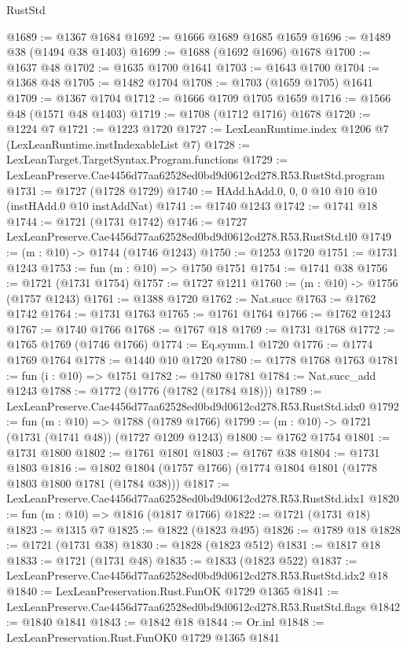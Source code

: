 \begin{lexlean}{RustStd}
\begin{coremodule}
@1689 := @1367 @1684
@1692 := @1666 @1689 @1685 @1659
@1696 := @1489 @38 (@1494 @38 @1403)
@1699 := @1688 (@1692 @1696) @1678
@1700 := @1637 @48
@1702 := @1635 @1700 @1641
@1703 := @1643 @1700
@1704 := @1368 @48
@1705 := @1482 @1704
@1708 := @1703 (@1659 @1705) @1641
@1709 := @1367 @1704
@1712 := @1666 @1709 @1705 @1659
@1716 := @1566 @48 (@1571 @48 @1403)
@1719 := @1708 (@1712 @1716) @1678
@1720 := @1224 @7
@1721 := @1223 @1720
@1727 := LexLeanRuntime.index @1206 @7 (LexLeanRuntime.instIndexableList @7)
@1728 := LexLeanTarget.TargetSyntax.Program.functions
@1729 := LexLeanPreserve.Cae4456d77aa62528ed0bd9d0612cd278.R53.RustStd.program
@1731 := @1727 (@1728 @1729)
@1740 := HAdd.hAdd.{0, 0, 0} @10 @10 @10 (instHAdd.{0} @10 instAddNat)
@1741 := @1740 @1243
@1742 := @1741 @18
@1744 := @1721 (@1731 @1742)
@1746 := @1727 LexLeanPreserve.Cae4456d77aa62528ed0bd9d0612cd278.R53.RustStd.tl0
@1749 := (m : @10) -> @1744 (@1746 @1243)
@1750 := @1253 @1720
@1751 := @1731 @1243
@1753 := fun (m : @10) => @1750 @1751
@1754 := @1741 @38
@1756 := @1721 (@1731 @1754)
@1757 := @1727 @1211
@1760 := (m : @10) -> @1756 (@1757 @1243)
@1761 := @1388 @1720
@1762 := Nat.succ
@1763 := @1762 @1742
@1764 := @1731 @1763
@1765 := @1761 @1764
@1766 := @1762 @1243
@1767 := @1740 @1766
@1768 := @1767 @18
@1769 := @1731 @1768
@1772 := @1765 @1769 (@1746 @1766)
@1774 := Eq.symm.{1} @1720
@1776 := @1774 @1769 @1764
@1778 := @1440 @10 @1720
@1780 := @1778 @1768 @1763
@1781 := fun (i : @10) => @1751
@1782 := @1780 @1781
@1784 := Nat.succ_add @1243
@1788 := @1772 (@1776 (@1782 (@1784 @18)))
@1789 := LexLeanPreserve.Cae4456d77aa62528ed0bd9d0612cd278.R53.RustStd.idx0
@1792 := fun (m : @10) => @1788 (@1789 @1766)
@1799 := (m : @10) -> @1721 (@1731 (@1741 @48)) (@1727 @1209 @1243)
@1800 := @1762 @1754
@1801 := @1731 @1800
@1802 := @1761 @1801
@1803 := @1767 @38
@1804 := @1731 @1803
@1816 := @1802 @1804 (@1757 @1766) (@1774 @1804 @1801 (@1778 @1803 @1800 @1781 (@1784 @38)))
@1817 := LexLeanPreserve.Cae4456d77aa62528ed0bd9d0612cd278.R53.RustStd.idx1
@1820 := fun (m : @10) => @1816 (@1817 @1766)
@1822 := @1721 (@1731 @18)
@1823 := @1315 @7
@1825 := @1822 (@1823 @495)
@1826 := @1789 @18
@1828 := @1721 (@1731 @38)
@1830 := @1828 (@1823 @512)
@1831 := @1817 @18
@1833 := @1721 (@1731 @48)
@1835 := @1833 (@1823 @522)
@1837 := LexLeanPreserve.Cae4456d77aa62528ed0bd9d0612cd278.R53.RustStd.idx2 @18
@1840 := LexLeanPreservation.Rust.FunOK @1729 @1365
@1841 := LexLeanPreserve.Cae4456d77aa62528ed0bd9d0612cd278.R53.RustStd.flags
@1842 := @1840 @1841
@1843 := @1842 @18
@1844 := Or.inl
@1848 := LexLeanPreservation.Rust.FunOK0 @1729 @1365 @1841

\end{coremodule}
\end{lexlean}
